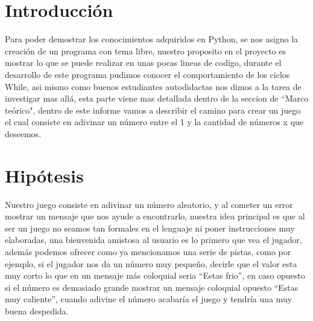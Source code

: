 \documentclass[12pt]{article}
\begin{document}
\newpage
\section{Introducción}
Para poder demostrar los conocimientos adquiridos en Python, se nos asigno la creación de un programa con tema libre, nuestro proposito en el proyecto es mostrar lo que se puede realizar en unas pocas lineas de codigo, durante el desarrollo de este programa pudimos conocer el comportamiento de los ciclos While, asi mismo como buenos estudiantes autodidactas nos dimos a la tarea de investigar mas allá, esta parte viene mas detallada dentro de la seccion de  “Marco teórico", dentro de este informe vamos a describir el camino para crear un juego el cual consiste en adivinar un número entre el 1 y la cantidad de números x que deseemos.

\section{Hipótesis}

Nuestro juego consiste en adivinar un número aleatorio, y al cometer un error mostrar un mensaje que nos ayude a encontrarlo, nuestra idea principal es que al ser un juego no seamos tan formales en el lenguaje ni poner instrucciones muy elaboradas, una bienvenida amistosa al usuario es lo primero que vea el jugador, además podemos ofrecer como ya mencionamos una serie de pistas, como por ejemplo, si el jugador nos da un número muy pequeño, decirle que el valor esta muy corto lo que en un mensaje más coloquial seria “Estas frio”, en caso opuesto si el número es demasiado grande mostrar un mensaje coloquial opuesto “Estas muy caliente”, cuando adivine el número acabaría el juego y tendría una muy buena despedida. 


\end{document}
